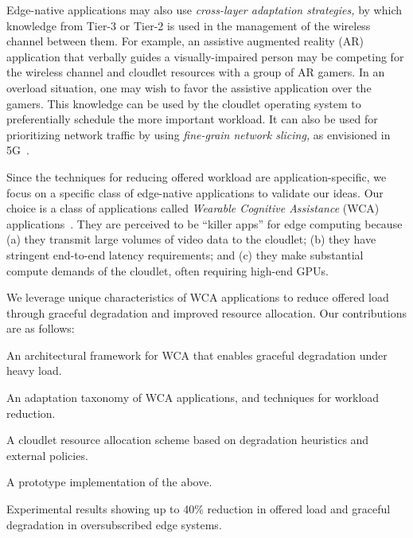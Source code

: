 Edge-native applications may also use {\em cross-layer adaptation
  strategies,} by which knowledge from Tier-3 or Tier-2 is used in the
management of the wireless channel between them.  For example, an
assistive augmented reality (AR) application that verbally guides a
visually-impaired person may be competing for the wireless channel and
cloudlet resources with a group of AR gamers.  In an overload
situation, one may wish to favor the assistive application over the
gamers.  This knowledge can be used by the cloudlet operating system
to preferentially schedule the more important workload.  It can also
be used for prioritizing network traffic by using {\em fine-grain
  network slicing,} as envisioned in 5G~\cite{Contreras2018}.

Since the techniques for reducing offered workload are application-specific, we
focus on a specific class of edge-native applications to validate our ideas.
Our choice is a class of applications called {\em Wearable Cognitive Assistance}
(WCA) applications~\cite{ha2014towards}.  They are perceived to be ``killer apps'' for
edge computing because (a) they transmit large volumes of video data to the
cloudlet; (b) they have stringent end-to-end latency requirements; and (c) they
make substantial compute demands of the cloudlet, often requiring high-end GPUs.

We leverage unique characteristics of WCA applications to reduce
offered load through graceful degradation and improved resource
allocation.  Our contributions are as follows:
\begin{smitemize}
  \item{An architectural framework for WCA that enables graceful degradation under heavy load.}
  \item{An adaptation taxonomy of WCA applications, and techniques for workload reduction.}
  \item{A cloudlet resource allocation scheme based on degradation heuristics and external policies.}
  \item{A prototype implementation of the above.}
  \item{Experimental results showing up to 40\% reduction in offered load and graceful degradation in oversubscribed edge systems.}
\end{smitemize}







